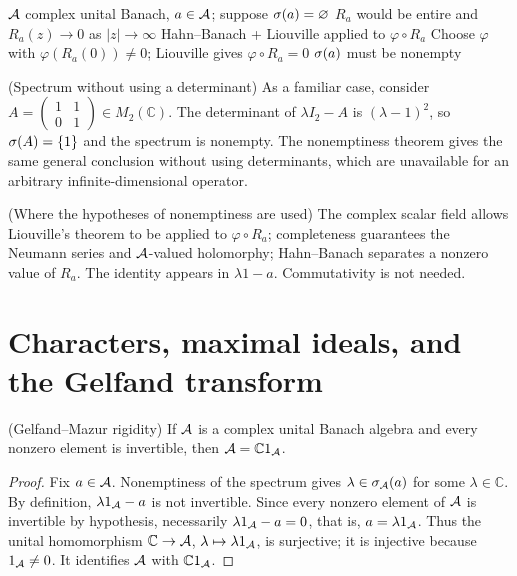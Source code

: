 \proofdiagrambranch
{$\mathcal A$ complex unital Banach, $a\in\mathcal A$; suppose $\sigma(a)=\varnothing$}
{$R_a$ would be entire and $R_a(z)\to0$ as $|z|\to\infty$}
{Hahn--Banach + Liouville applied to $\varphi\circ R_a$}
{Choose $\varphi$ with $\varphi(R_a(0))\ne0$; Liouville gives $\varphi\circ R_a=0$}
{$\sigma(a)$ must be nonempty}

\begin{cthejemplo}{(Spectrum without using a determinant)}
As a familiar case, consider
$A=\begin{pmatrix}1&1\\0&1\end{pmatrix}\in M_2(\mathbb C)$.
The determinant of $\lambda I_2-A$ is $(\lambda-1)^2$, so
$\sigma(A)=\{1\}$ and the spectrum is nonempty.
The nonemptiness theorem gives the same general conclusion without
using determinants, which are unavailable for an arbitrary
infinite-dimensional operator.
\end{cthejemplo}

\begin{cthnota}{(Where the hypotheses of nonemptiness are used)}
The complex scalar field allows Liouville's theorem to be applied to $\varphi\circ R_a$; completeness
guarantees the Neumann series and $\mathcal A$-valued holomorphy; Hahn--Banach separates a
nonzero value of $R_a$. The identity appears in $\lambda1-a$. Commutativity is
not needed.
\end{cthnota}

\section{Characters, maximal ideals, and the Gelfand transform}

\begin{cthteorema}{(Gelfand--Mazur rigidity)}
If $\mathcal A$ is a complex unital Banach algebra and every nonzero element
is invertible, then
$\mathcal A=\mathbb C1_\mathcal A$.
\end{cthteorema}

\begin{proof}[Proof]
Fix $a\in\mathcal A$. Nonemptiness of the spectrum gives
$\lambda\in\sigma_\mathcal A(a)$ for some $\lambda\in\mathbb C$.
By definition, $\lambda1_\mathcal A-a$ is not invertible. Since every
nonzero element of $\mathcal A$ is invertible by hypothesis, necessarily
$\lambda1_\mathcal A-a=0$, that is, $a=\lambda1_\mathcal A$.
Thus the unital homomorphism $\mathbb C\to\mathcal A$,
$\lambda\mapsto\lambda1_\mathcal A$, is surjective; it is injective because
$1_\mathcal A\ne0$. It identifies $\mathcal A$ with $\mathbb C1_\mathcal A$.
\end{proof}

